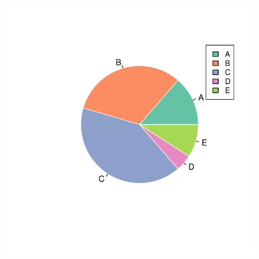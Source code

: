 \documentclass{article}\usepackage[]{graphicx}\usepackage[]{color}
\makeatletter
\def\maxwidth{ %
  \ifdim\Gin@nat@width>\linewidth
    \linewidth
  \else
    \Gin@nat@width
  \fi
}
\newenvironment{knitrout}{}{} %
\makeatother
\begin{document}
\begin{knitrout}
\color{fgcolor}
\includegraphics[width=\maxwidth]{figure/plot_pie_basic-1} 

\end{knitrout}
\clearpage
\end{document}
